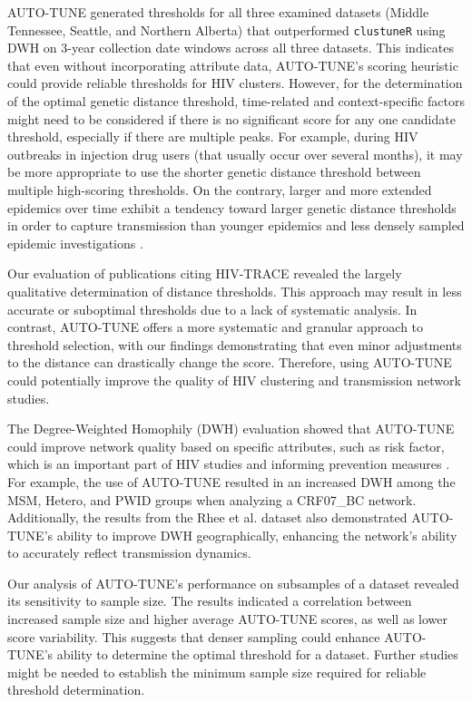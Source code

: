 \documentclass[utf8]{FrontiersinHarvard} %
\begin{document}
AUTO-TUNE generated thresholds for all three examined datasets (Middle
Tennessee, Seattle, and Northern Alberta) that outperformed {\tt clustuneR}
using DWH on 3-year collection date windows across all three datasets. This
indicates that even without incorporating attribute data, AUTO-TUNE's scoring
heuristic could provide reliable thresholds for HIV clusters. However, for the
determination of the optimal genetic distance threshold, time-related and
context-specific factors might need to be considered if there is no significant
score for any one candidate threshold, especially if there are multiple peaks.
For example, during HIV outbreaks in injection drug users (that usually occur
over several months), it may be more appropriate to use the shorter genetic
distance threshold \citep{peters_hiv_2016,campbell_detailed_2017} between
multiple high-scoring thresholds. On the contrary, larger and more extended
epidemics over time exhibit a tendency toward larger genetic distance
thresholds in order to capture transmission than younger epidemics and less
densely sampled epidemic investigations
\citep{patil_exploring_2022,leung_molecular_2019,di_giallonardo_subtype-specific_2021}.

Our evaluation of publications citing HIV-TRACE revealed the largely
qualitative determination of distance thresholds. This approach may result in
less accurate or suboptimal thresholds due to a lack of systematic analysis. In
contrast, AUTO-TUNE offers a more systematic and granular approach to threshold
selection, with our findings demonstrating that even minor adjustments to the
distance can drastically change the score. Therefore, using AUTO-TUNE could
potentially improve the quality of HIV clustering and transmission network
studies.

The Degree-Weighted Homophily (DWH) evaluation showed that AUTO-TUNE could
improve network quality based on specific attributes, such as risk factor,
which is an important part of HIV studies and informing prevention measures
\citep{potterat_risk_2002,fujimoto_methodological_2021}. For example, the use
of AUTO-TUNE resulted in an increased DWH among the MSM, Hetero, and PWID
groups when analyzing a CRF07\_BC network. Additionally, the results from the
Rhee et al. dataset also demonstrated AUTO-TUNE's ability to improve DWH
geographically, enhancing the network's ability to accurately reflect
transmission dynamics.

Our analysis of AUTO-TUNE's performance on subsamples of a dataset revealed its
sensitivity to sample size. The results indicated a correlation between
increased sample size and higher average AUTO-TUNE scores, as well as lower
score variability. This suggests that denser sampling could enhance AUTO-TUNE's
ability to determine the optimal threshold for a dataset. Further studies might
be needed to establish the minimum sample size required for reliable threshold
determination.
\end{document}
